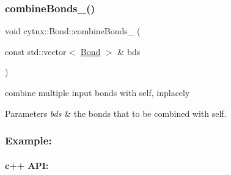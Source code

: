 \subsubsection{\texorpdfstring{combine\+Bonds\+\_\+()}{combineBonds\_()}}
{\footnotesize\ttfamily void cytnx\+::\+Bond\+::combine\+Bonds\+\_\+ (\begin{DoxyParamCaption}\item[{const std\+::vector$<$ \hyperlink{classcytnx_1_1Bond}{Bond} $>$ \&}]{bds }\end{DoxyParamCaption})\hspace{0.3cm}{\ttfamily [inline]}}



combine multiple input bonds with self, inplacely 


\begin{DoxyParams}{Parameters}
{\em bds} & the bonds that to be combined with self.\\
\hline
\end{DoxyParams}
\subsubsection*{Example\+:}

\paragraph*{c++ A\+PI\+:}


